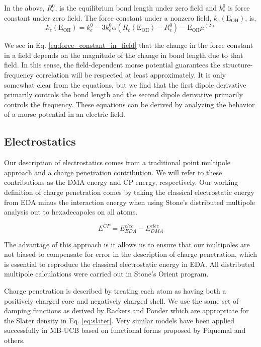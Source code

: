 \documentclass[journal=jacsat,manuscript=article]{achemso}
\begin{document}
In the above, $R_e^0$, is the equilibrium bond length under zero field and $k_e^0$ is
force constant under zero field. The force constant under a nonzero field, $k_e(\mathrm{E_{OH}})$, is,
\begin{equation}
  k_e(\mathrm{E_{OH}})=k_e^0-3k_e^0\alpha\left(R_e(\mathrm{E_{OH}})-R_e^0\right)-\mathrm{E_{OH}}\mu^{(2)}
  \label{eq:force_constant_in_field}
\end{equation}

We see in Eq. \ref{eq:force_constant_in_field} that the change in the force constant in a field depends on the magnitude of the change in bond length due to that field. In this sense, the field-dependent morse potential guarantees the structure-frequency correlation will be respected at least approximately. It is only somewhat clear from the equations, but we find that the first dipole derivative primarily controls the bond length and the second dipole derivative primarily controls the frequency. These equations can be derived by analyzing the behavior of a morse potential in an electric field.\cite{boyer2019beyond}


\subsection*{Electrostatics}

Our description of electrostatics comes from a traditional point multipole approach and a charge penetration contribution. We will refer to these contributions as the DMA energy and CP energy, respectively. Our working definition of charge penetration comes by taking the classical electrostatic energy from EDA minus the interaction energy when using Stone's distributed multipole analysis\cite{stone1981distributed,stone1985distributeda} out to hexadecapoles on all atoms.

\begin{equation}
  E^{CP}=E^{elec}_{EDA}-E^{elec}_{DMA}
  \label{eq:cp}
\end{equation}

The advantage of this approach is it allows us to ensure that our multipoles are not biased to compensate for error in the description of charge penetration, which is essential to reproduce the classical electrostatic energy in EDA. All distributed multipole calculations were carried out in Stone's Orient program.\cite{stone2002orient}

Charge penetration is described by treating each atom as having both a positively charged core and negatively charged shell. We use the same set of damping functions as derived by Rackers and Ponder which are appropriate for the Slater density in Eq. \ref{eq:slater}.\cite{rackers2021polarizable} Very similar models have been applied successfully in MB-UCB\cite{das2019development} based on functional forms proposed by Piquemal\cite{piquemal2003improved} and others\cite{wang2015general,rackers2017optimized}.
\end{document}
